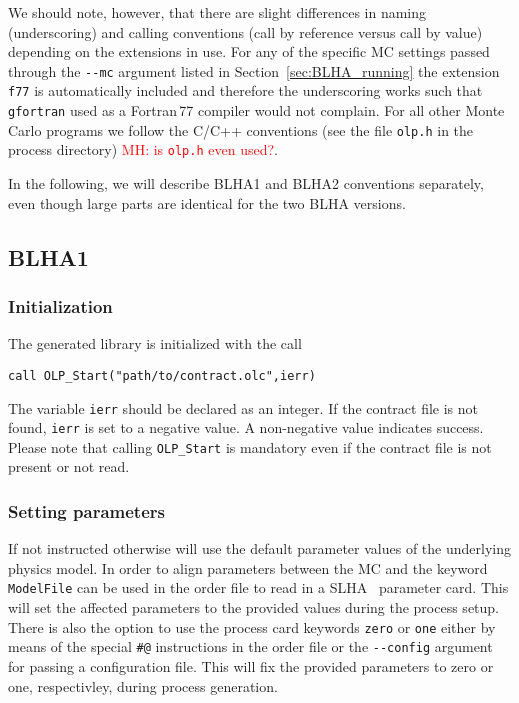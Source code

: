 We should note, however, that there are slight differences in naming (underscoring) and calling conventions (call by reference versus call by value) depending on the extensions in use. For any of the specific MC settings passed through the \lstinline[style=sh]|--mc| argument listed in Section~\ref{sec:BLHA_running} the extension \texttt{f77} is automatically included and therefore the underscoring works such that \texttt{gfortran} used as a Fortran\,77 compiler would not complain. For all other Monte Carlo programs we follow the C/C++ conventions
(see the file \texttt{olp.h} in the process directory) \textcolor{red}{MH: is \texttt{olp.h} even used?}.

In the following, we will describe BLHA1 and BLHA2 conventions separately, even though large parts are identical for the two BLHA versions.

%
%
%

\subsection{BLHA1}

\subsubsection{Initialization}
The generated \gosam{} library is initialized with the call
\begin{lstlisting}[style=fortran]
      call OLP_Start("path/to/contract.olc",ierr)
\end{lstlisting}
The variable \texttt{ierr} should be declared as an integer. If the contract file is not found, \texttt{ierr} is set to a negative value. A non-negative value indicates success. Please note that calling \texttt{OLP\_Start} is mandatory even if the contract file is not present or not read.


\subsubsection{Setting parameters}
If not instructed otherwise \gosam will use the default parameter values of the underlying physics model. In order to align parameters between the MC and \gosam the keyword \texttt{ModelFile} can be used in the order file to read in a SLHA~\cite{Skands:2003cj,Allanach:2008qq} parameter card. This will set the affected parameters to the provided values during the process setup. There is also the option to use the process card keywords \texttt{zero} or \texttt{one} either by means of the special \texttt{\#@} instructions in the order file or the \lstinline[style=sh]|--config| argument for passing a configuration file. This will fix the provided parameters to zero or one, respectivley, during process generation.

